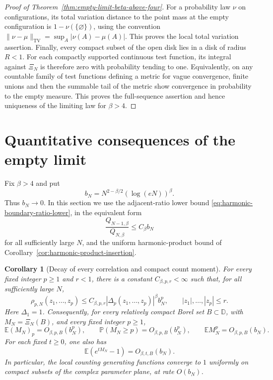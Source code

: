 \documentclass[11pt,a4paper]{article}
\numberwithin{equation}{section}
\newtheorem{corollary}[theorem]{Corollary}
\theoremstyle{definition}
\theoremstyle{remark}
\newcommand{\D}{\mathbb D}
\begin{document}
\begin{proof}[Proof of Theorem~\ref{thm:empty-limit-beta-above-four}]
For a probability law $\nu$ on configurations, its total variation
distance to the point mass at the empty configuration is
$1-\nu(\{\varnothing\})$, using the convention
$\|\nu-\mu\|_{\mathrm{TV}}=\sup_A|\nu(A)-\mu(A)|$.
This proves the local total variation assertion. Finally, every compact
subset of the open disk lies in a disk of radius $R<1$. For each compactly
supported continuous test function, its integral against $\Xi_N$ is
therefore zero with probability tending to one. Equivalently, on any
countable family of test functions defining a metric for vague
convergence, finite unions and then the summable tail of the metric show
convergence in probability to the empty measure. This proves the
full-sequence assertion and hence uniqueness of the limiting law for
$\beta>4$.
\end{proof}

\section{Quantitative consequences of the empty limit}
\label{sec:empty-limit-correlations}

Fix $\beta>4$ and put
\[
 b_N=N^{2-\beta/2}(\log(eN))^\beta.
\]
Thus $b_N\to0$. In this section we use the adjacent-ratio lower bound
\eqref{eq:harmonic-boundary-ratio-lower}, in the equivalent form
\begin{equation}\label{eq:empty-ratio-input}
 \frac{Q_{N-1,\beta}}{Q_{N,\beta}}\leq C_\beta b_N
\end{equation}
for all sufficiently large $N$, and the uniform harmonic-product bound
of Corollary~\ref{cor:harmonic-product-insertion}.

\begin{corollary}[Decay of every correlation and compact count moment]
\label{cor:empty-correlation-rates}
For every fixed integer $p\geq1$ and $r<1$, there is a constant
$C_{\beta,p,r}<\infty$ such that, for all sufficiently large $N$,
\begin{equation}\label{eq:empty-p-correlation-rate}
 \rho_{p,N}(z_1,\ldots,z_p)
 \leq C_{\beta,p,r}|\Delta_p(z_1,\ldots,z_p)|^\beta b_N^p,
 \qquad |z_1|,\ldots,|z_p|\leq r.
\end{equation}
Here $\Delta_1=1$. Consequently, for every relatively compact Borel
set $B\subset\D$, with $M_N=\Xi_N(B)$, and every fixed integer $p\geq1$,
\begin{equation}\label{eq:empty-factorial-hit-rates}
 \mathbb E(M_N)_p=O_{\beta,p,B}(b_N^p),\qquad
 \mathbb P(M_N\geq p)=O_{\beta,p,B}(b_N^p),\qquad
 \mathbb E M_N^p=O_{\beta,p,B}(b_N).
\end{equation}
For each fixed $t\geq0$, one also has
\begin{equation}\label{eq:empty-count-exponential-rate}
 \mathbb E(e^{tM_N}-1)=O_{\beta,t,B}(b_N).
\end{equation}
In particular, the local counting generating functions converge to $1$
uniformly on compact subsets of the complex parameter plane, at rate
$O(b_N)$.
\end{corollary}
\end{document}
